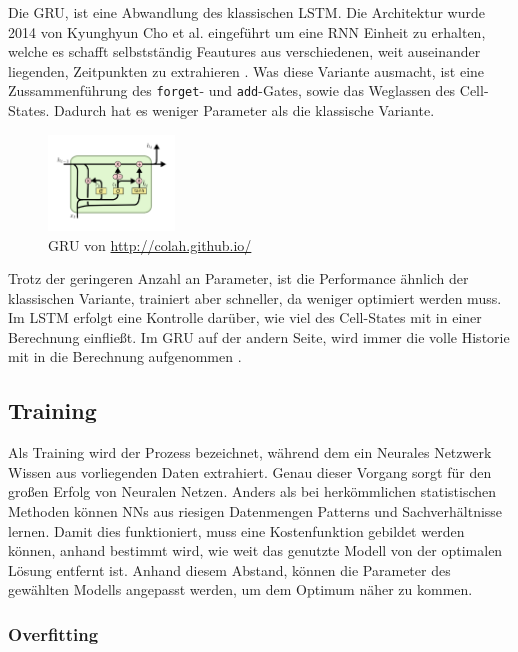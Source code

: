 \documentclass[pdftex,a4paper,halfparskip, article]{scrartcl}
\begin{document}
Die GRU, ist eine Abwandlung des klassischen LSTM. Die Architektur wurde 2014 von Kyunghyun Cho et al. eingeführt \cite{DBLP:journals/corr/ChoMGBSB14} um eine RNN Einheit zu erhalten, welche es schafft selbstständig Feautures aus verschiedenen, weit auseinander liegenden, Zeitpunkten zu extrahieren \cite{paperGRUComparison}. Was diese Variante ausmacht, ist eine Zussammenführung des \texttt{forget}- und \texttt{add}-Gates, sowie das Weglassen des Cell-States. Dadurch hat es weniger Parameter als die klassische Variante.
\begin{figure}[h]
\centering
\includegraphics[width=0.3\textwidth]{colah_gru_small}
\caption{GRU von \url{http://colah.github.io/}}
\end{figure}
Trotz der geringeren Anzahl an Parameter, ist die Performance ähnlich der klassischen Variante\cite{lstmSearchSpace}, trainiert aber schneller, da weniger optimiert werden muss.  Im LSTM erfolgt eine Kontrolle darüber, wie viel des Cell-States mit in einer Berechnung einfließt. Im GRU auf der andern Seite, wird immer die volle Historie mit in die Berechnung aufgenommen \cite{paperGRUComparison}. 


\subsection{Training}

Als Training wird der Prozess bezeichnet, während dem ein Neurales Netzwerk Wissen aus vorliegenden Daten extrahiert. Genau dieser Vorgang sorgt für den großen Erfolg von Neuralen Netzen. Anders als bei herkömmlichen statistischen Methoden können NNs aus riesigen Datenmengen Patterns und Sachverhältnisse lernen. Damit dies funktioniert, muss eine Kostenfunktion gebildet werden können, anhand bestimmt wird, wie weit das genutzte Modell von der optimalen Lösung entfernt ist. Anhand diesem Abstand, können die Parameter des gewählten Modells angepasst werden, um dem Optimum näher zu kommen.

\subsubsection{Overfitting}
	
\end{document}

